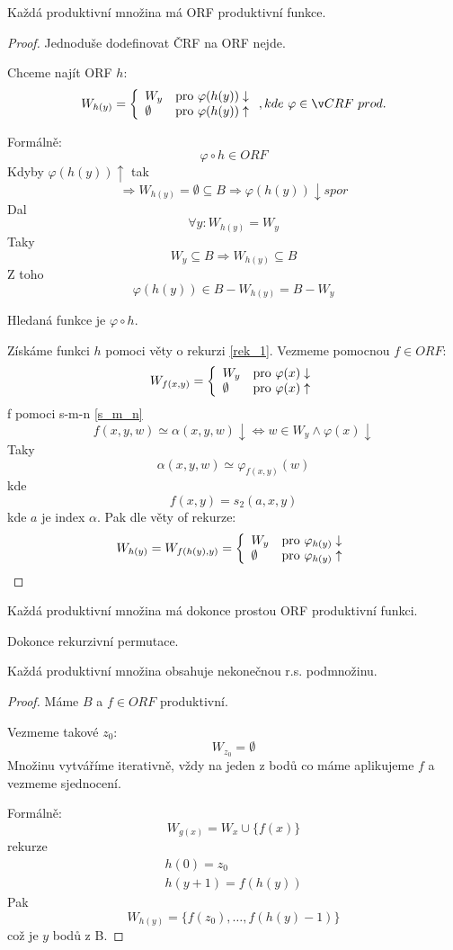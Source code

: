 \begin{theorem}
	Každá produktivní množina má ORF produktivní funkce.
\end{theorem}
\begin{proof}
	Jednoduše dodefinovat ČRF na ORF nejde.

	Chceme najít ORF $h$:
	\[ W_{h(y)} = \twopartdef { W_y } { \varphi(h(y)) \downarrow } { \emptyset } { \varphi(h(y)) \uparrow }, kde\ \varphi \in ČRF\ prod. \]

	Formálně:
	\[ \varphi \circ h \in ORF \]
	Kdyby $\varphi(h(y)) \uparrow$ tak
	\[ \Rightarrow W_{h(y)} = \emptyset \subseteq B \Rightarrow \varphi(h(y)) \downarrow spor \]
	Dal
	\[ \forall y: W_{h(y)} = W_y \]
	Taky
	\[ W_y \subseteq B \Rightarrow W_{h(y)} \subseteq B \]
	Z toho
	\[ \varphi(h(y)) \in B - W_{h(y)} = B - W_y \]

	Hledaná funkce je $\varphi \circ h$.

	Získáme funkci $h$ pomoci věty o rekurzi \cref{rek_1}.
	Vezmeme pomocnou $f \in ORF$:
	\[ W_{f(x, y)} = \left\{ \begin{array}{ll}  W_y  & \mbox{pro }  \varphi(x) \downarrow  \\  \emptyset  & \mbox{pro }  \varphi(x) \uparrow  \end{array} \right. \]
	f pomoci s-m-n \cref{s_m_n}
	\[ f(x, y, w) \simeq \alpha(x, y, w) \downarrow \iff w \in W_y \land \varphi(x) \downarrow \]
	Taky
	\[ \alpha(x, y, w) \simeq \varphi_{f(x, y)} (w) \]
	kde
	\[ f(x, y) = s_2(a, x, y) \]
	kde $a$ je index $\alpha$.
	Pak dle věty of rekurze:
	\[ W_{h(y)} = W_{f(h(y), y)} = \left\{ \begin{array}{ll}  W_y  & \mbox{pro }  \varphi_{h(y)} \downarrow  \\  \emptyset  & \mbox{pro }  \varphi_{h(y)} \uparrow  \end{array} \right. \]

\end{proof}

\begin{theorem}
	Každá produktivní množina má dokonce prostou ORF produktivní funkci.

	Dokonce rekurzivní permutace.
\end{theorem}

\begin{theorem}\label{product_inf}
	Každá produktivní množina obsahuje nekonečnou r.s. podmnožinu.
\end{theorem}
\begin{proof}
	Máme $B$ a $f \in ORF$ produktivní.

	Vezmeme takové $z_0$:
	\[ W_{z_0} = \emptyset \]
	Množinu vytváříme iterativně, vždy na jeden z bodů co máme aplikujeme $f$ a vezmeme sjednocení.

	Formálně:
	\[ W_{g(x)} = W_x \cup \{ f(x) \} \]
	rekurze
	\begin{align}
		h(0) = z_0\\
		h(y + 1) = f(h(y))
	\end{align}
	Pak
	\[ W_{h(y)} = \{ f(z_0), \ldots, f(h(y) - 1) \} \]
	což je $y$ bodů z B.
\end{proof}

